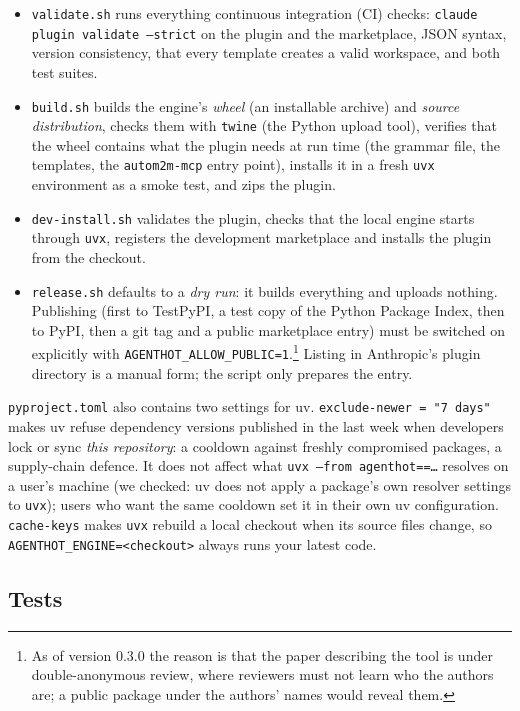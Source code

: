 \documentclass[10pt,a4paper]{article}
\newcommand{\code}[1]{\texttt{#1}}
\newcommand{\file}[1]{\texttt{#1}}
\begin{document}
\begin{itemize}
\item \file{validate.sh} runs everything continuous integration (CI) checks:
\code{claude plugin validate --strict} on the plugin and the marketplace,
JSON syntax, version consistency, that every template creates a valid
workspace, and both test suites.
\item \file{build.sh} builds the engine's \emph{wheel} (an installable
archive) and \emph{source distribution}, checks them with \code{twine} (the
Python upload tool), verifies that the wheel contains what the plugin needs at
run time (the grammar file, the templates, the \code{autom2m-mcp} entry
point), installs it in a fresh \code{uvx} environment as a smoke test, and
zips the plugin.
\item \file{dev-install.sh} validates the plugin, checks that the local
engine starts through \code{uvx}, registers the development marketplace and
installs the plugin from the checkout.
\item \file{release.sh} defaults to a \emph{dry run}: it builds everything
and uploads nothing. Publishing (first to TestPyPI, a test copy of the Python
Package Index, then to PyPI, then a git tag and a public marketplace entry)
must be switched on explicitly with \code{AGENTHOT\_ALLOW\_PUBLIC=1}.\footnote{As
of version 0.3.0 the reason is that the paper describing the tool is under
double-anonymous review, where reviewers must not learn who the authors are;
a public package under the authors' names would reveal them.} Listing in
Anthropic's plugin directory is a manual form; the script only prepares the
entry.
\end{itemize}

\file{pyproject.toml} also contains two settings for uv.
\code{exclude-newer = "7 days"} makes uv refuse dependency versions
published in the last week when developers lock or sync \emph{this
repository}: a cooldown against freshly compromised packages, a supply-chain
defence. It does not affect what \code{uvx --from agenthot==\ldots} resolves on
a user's machine (we checked: uv does not apply a package's own resolver
settings to \code{uvx}); users who want the same cooldown set it in their own
uv configuration. \code{cache-keys} makes \code{uvx} rebuild a local checkout
when its source files change, so \code{AGENTHOT\_ENGINE=<checkout>} always
runs your latest code.

\subsection{Tests}
\end{document}
